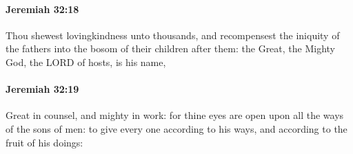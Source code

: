 		\paragraph{Jeremiah 32:18} %
			\label{JEREMIAH-32-18}

			Thou shewest lovingkindness unto thousands, and recompensest the iniquity of the fathers into the bosom of their children after them: the Great, the Mighty God, the LORD of hosts, is his name,


		\paragraph{Jeremiah 32:19} %
			\label{JEREMIAH-32-19}

			Great in counsel, and mighty in work: for thine eyes are open upon all the ways of the sons of men: to give every one according to his ways, and according to the fruit of his doings:

